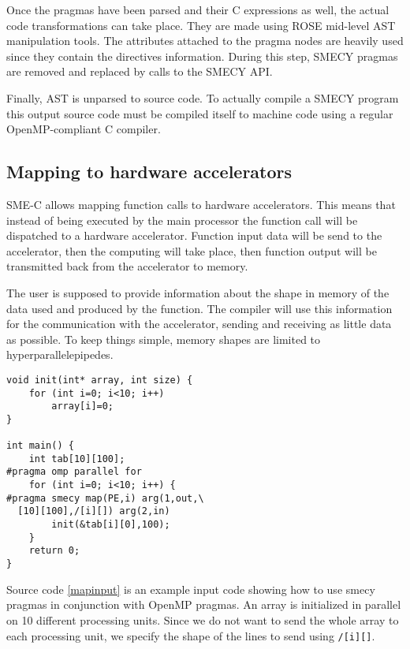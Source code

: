 \documentclass [A4]{article}
\begin{document}
	Once the pragmas have been parsed and their C expressions as well, the actual code transformations can take place. They are made using ROSE mid-level AST manipulation tools. The attributes attached to the pragma nodes are heavily used since they contain the directives information. During this step, SMECY pragmas are removed and replaced by calls to the SMECY API.
	
	Finally, AST is unparsed to source code. To actually compile a SMECY program this output source code must be compiled itself to machine code using a regular OpenMP-compliant C compiler.
	
	
	\subsection{Mapping to hardware accelerators}
	SME-C allows mapping function calls to hardware accelerators. This means that instead of being executed by the main processor the function call will be dispatched to a hardware accelerator. Function input data will be send to the accelerator, then the computing will take place, then function output will be transmitted back from the accelerator to memory.
	
	The user is supposed to provide information about the shape in memory of the data used and produced by the function. The compiler will use this information for the communication with the accelerator, sending and receiving as little data as possible. To keep things simple, memory shapes are limited to hyperparallelepipedes.
	
	\begin{lstlisting}[label=mapinput,caption={Input code with hardware mapping pragma}]
void init(int* array, int size) {
	for (int i=0; i<10; i++)
		array[i]=0;
}

int main() {
	int tab[10][100];
#pragma omp parallel for
	for (int i=0; i<10; i++) {
#pragma smecy map(PE,i) arg(1,out,\
  [10][100],/[i][]) arg(2,in)
		init(&tab[i][0],100);
	}
	return 0;
}
	\end{lstlisting}
	
	Source code \ref{mapinput} is an example input code showing how to use smecy pragmas in conjunction with OpenMP pragmas. An array is initialized in parallel on 10 different processing units. Since we do not want to send the whole array to each processing unit, we specify the shape of the lines to send using \verb+/[i][]+.
	
\end{document}
